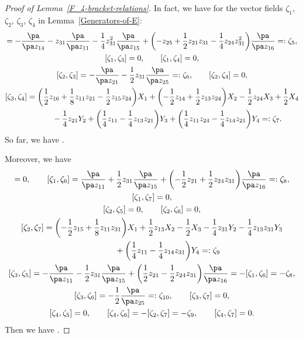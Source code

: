 \begin{proof}[Proof of Lemma~\ref{F_4-bracket-relations}]
In fact, we have for the vector fields $\zeta_1$, $\zeta_2$, $\zeta_3$, $\zeta_4$ in Lemma~\ref{Generators-of-E}:
\begin{gather*}
[\zeta_1, \zeta_2] = - \frac{\pa}{\pa z_{14}} - z_{31}\frac{\pa}{\pa z_{11}} - \frac{1}{4}z_{31}^2\frac{\pa}{\pa z_{15}}
+ \biggl(
- z_{25} + \frac{1}{2}z_{21}z_{31} - \frac{1}{4}z_{24}z_{31}^2\biggr)\frac{\pa}{\pa z_{16}} =: \zeta_5,
\\
[\zeta_1, \zeta_3] = 0,\qquad [\zeta_1, \zeta_4] = 0,
\\
[\zeta_2, \zeta_3] = - \frac{\pa}{\pa z_{21}} - \frac{1}{2}z_{31}\frac{\pa}{\pa z_{25}} =: \zeta_6,
\qquad
[\zeta_2, \zeta_4] = 0,
\\
[\zeta_3, \zeta_4] = \biggl(\frac{1}{2}z_{16} + \frac{1}{8}z_{11}z_{21} - \frac{1}{2}z_{15}z_{24}\biggr)X_1 +
\biggl(- \frac{1}{2}z_{14} + \frac{1}{2}z_{13}z_{24}\biggr)X_2 - \frac{1}{2}z_{24}X_3 + \frac{1}{2}X_4
\\
\hphantom{[\zeta_3, \zeta_4] =}{}
 - \frac{1}{4}z_{21}Y_2
+ \biggl(\frac{1}{4}z_{11} - \frac{1}{4}z_{13}z_{21}\biggr)Y_3 + \biggl(\frac{1}{4}z_{11}z_{24} - \frac{1}{4}z_{14}z_{21}\biggr)Y_4 =: \zeta_7.
\end{gather*}
So far, we have .

Moreover, we have
\begin{gather*}
[\zeta_1, \zeta_5] = 0,
\qquad
[\zeta_1, \zeta_6] = \frac{\pa}{\pa z_{11}} + \frac{1}{2}z_{31}\frac{\pa}{\pa z_{15}}
+ \biggl(-\frac{1}{2}z_{21} + \frac{1}{2}z_{24}z_{31}\biggr)\frac{\pa}{\pa z_{16}} =: \zeta_8,
\\
[\zeta_1, \zeta_7] = 0, \\
[\zeta_2, \zeta_5] = 0, \qquad [\zeta_2, \zeta_6] = 0,
\\
[\zeta_2, \zeta_7] = \biggl(-\frac{1}{2}z_{15} + \frac{1}{8}z_{11}z_{31}\biggr)X_1 +
\frac{1}{2}z_{13}X_2 - \frac{1}{2}X_3
- \frac{1}{4}z_{31}Y_2 - \frac{1}{4}z_{13}z_{31}Y_3
\\
\hphantom{[\zeta_2, \zeta_7] = }{}
+ \biggl(\frac{1}{4}z_{11} - \frac{1}{4}z_{14}z_{31}\biggr)Y_4 =: \zeta_9
\\
[\zeta_3, \zeta_5] = - \frac{\pa}{\pa z_{11}} - \frac{1}{2}z_{31}\frac{\pa}{\pa z_{15}}
+ \biggl(\frac{1}{2}z_{21} - \frac{1}{2}z_{24}z_{31}\biggr)\frac{\pa}{\pa z_{16}} = - [\zeta_1, \zeta_6] = - \zeta_8,
\\
[\zeta_3, \zeta_6] = -\frac{1}{2}\frac{\pa}{\pa z_{25}} =: \zeta_{10}, \qquad [\zeta_3, \zeta_7] = 0,
\\
[\zeta_4, \zeta_5] = 0,
\qquad
[\zeta_4, \zeta_6] = - [\zeta_2, \zeta_7] = - \zeta_9, \qquad [\zeta_4, \zeta_7] = 0.
\end{gather*}
Then we have .


\end{proof}
